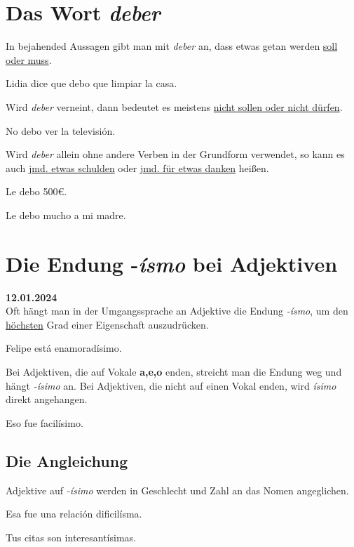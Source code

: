 \section{Das Wort \textit{deber}}
In bejahended Aussagen gibt man mit \textit{deber} an, dass 
etwas getan werden \underline{soll oder muss}.
\begin{ejemplos}
    \item Lidia dice que debo que limpiar la casa.
\end{ejemplos}
Wird \textit{deber} verneint, dann bedeutet es meistens 
\underline{nicht sollen oder nicht dürfen}.
\begin{ejemplos}
    \item No debo ver la televisi\'on.
\end{ejemplos}
Wird \textit{deber} allein ohne andere Verben in der Grundform
verwendet, so kann es auch \underline{jmd. etwas schulden} oder
\underline{jmd. für etwas danken} heißen.
\begin{ejemplos}
    \item Le debo 500€.
    \item Le debo mucho a mi madre. 
\end{ejemplos}

\section{Die Endung -\textit{\'ismo} bei Adjektiven}
\textbf{12.01.2024}\\
Oft hängt man in der Umgangssprache an Adjektive
die Endung \textit{-\'ismo}, um den 
\underline{höchsten} Grad einer Eigenschaft auszudrücken.
\begin{ejemplos}
    \item Felipe est\'a enamorad\'isimo.
\end{ejemplos}
Bei Adjektiven, die auf Vokale \textbf{a,e,o} enden,
streicht man die Endung weg und hängt \textit{-\'isimo}
an. Bei Adjektiven, die nicht auf einen Vokal enden,
wird \textit{\'isimo} direkt angehangen.
\begin{ejemplos}
    \item Eso fue facil\'isimo.
\end{ejemplos}
\subsection*{Die Angleichung}
Adjektive auf \textit{-\'isimo} werden in Geschlecht 
und Zahl an das Nomen angeglichen.
\begin{ejemplos}
    \item Esa fue una relaci\'on dificil\'isma.
    \item Tus citas son interesant\'isimas.
\end{ejemplos}
